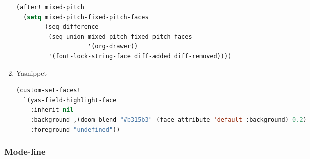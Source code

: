 \documentclass[11pt]{article}
\begin{document}
\begin{enumerate}
\begin{lstlisting}[language=Lisp]
(after! mixed-pitch
  (setq mixed-pitch-fixed-pitch-faces
        (seq-difference
         (seq-union mixed-pitch-fixed-pitch-faces
                    '(org-drawer))
         '(font-lock-string-face diff-added diff-removed))))
\end{lstlisting}
  \item Yasnippet
  \label{sec:yasnippet-1}

  \begin{lstlisting}[language=Lisp]
(custom-set-faces!
  `(yas-field-highlight-face
    :inherit nil
    :background ,(doom-blend "#b315b3" (face-attribute 'default :background) 0.2)
    :foreground "undefined"))
\end{lstlisting}
\end{enumerate}

\subsubsection{Mode-line}
\label{sec:mode-line}
\end{document}
